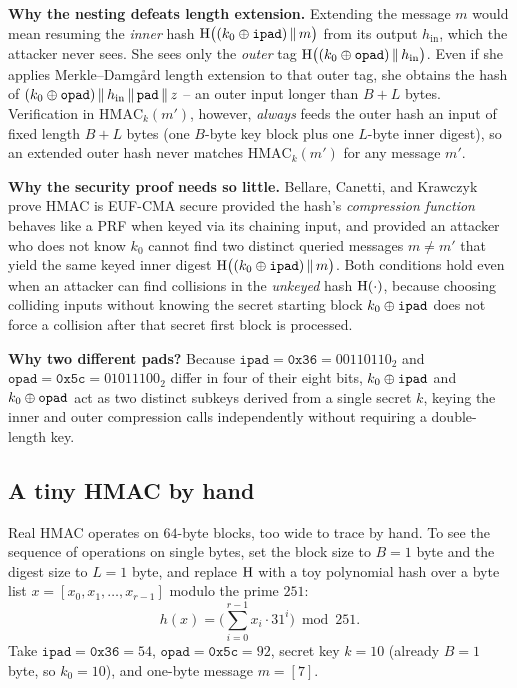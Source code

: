 \begin{whybox}
\textbf{Why the nesting defeats length extension.} Extending the message $m$ would mean resuming the \emph{inner} hash $\operatorname{H}\bigl((k_0\oplus\texttt{ipad})\,\|\, m\bigr)$ from its output $h_{\mathrm{in}}$, which the attacker never sees. She sees only the \emph{outer} tag $\operatorname{H}\bigl((k_0\oplus\texttt{opad})\,\|\, h_{\mathrm{in}}\bigr)$. Even if she applies Merkle--Damg\aa{}rd length extension to that outer tag, she obtains the hash of $(k_0\oplus\texttt{opad})\,\|\, h_{\mathrm{in}}\,\|\,\texttt{pad}\,\|\, z$ -- an outer input longer than $B+L$ bytes. Verification in $\mathrm{HMAC}_k(m')$, however, \emph{always} feeds the outer hash an input of fixed length $B+L$ bytes (one $B$-byte key block plus one $L$-byte inner digest), so an extended outer hash never matches $\mathrm{HMAC}_k(m')$ for any message $m'$.

\textbf{Why the security proof needs so little.} Bellare, Canetti, and Krawczyk prove HMAC is EUF-CMA secure provided the hash's \emph{compression function} behaves like a PRF when keyed via its chaining input, and provided an attacker who does not know $k_0$ cannot find two distinct queried messages $m \ne m'$ that yield the same keyed inner digest $\operatorname{H}\bigl((k_0\oplus\texttt{ipad})\,\|\, m\bigr)$. Both conditions hold even when an attacker can find collisions in the \emph{unkeyed} hash $\operatorname{H}(\cdot)$, because choosing colliding inputs without knowing the secret starting block $k_0\oplus\texttt{ipad}$ does not force a collision after that secret first block is processed.

\textbf{Why two different pads?} Because $\texttt{ipad} = \texttt{0x36} = 00110110_2$ and $\texttt{opad} = \texttt{0x5c} = 01011100_2$ differ in four of their eight bits, $k_0\oplus\texttt{ipad}$ and $k_0\oplus\texttt{opad}$ act as two distinct subkeys derived from a single secret $k$, keying the inner and outer compression calls independently without requiring a double-length key.
\end{whybox}

\subsection{A tiny HMAC by hand}
\label{ch15:hmac-toy}

Real HMAC operates on $64$-byte blocks, too wide to trace by hand. To see the sequence of operations on single bytes, set the block size to $B=1$ byte and the digest size to $L=1$ byte, and replace $\operatorname{H}$ with a toy polynomial hash over a byte list $x = [x_0, x_1, \dots, x_{r-1}]$ modulo the prime $251$:
\[
  h(x) = \Biggl(\sum_{i=0}^{r-1} x_i \cdot 31^{i}\Biggr) \bmod 251.
\]
Take $\texttt{ipad}=\texttt{0x36}=54$, $\texttt{opad}=\texttt{0x5c}=92$, secret key $k = 10$ (already $B=1$ byte, so $k_0=10$), and one-byte message $m = [7]$.

